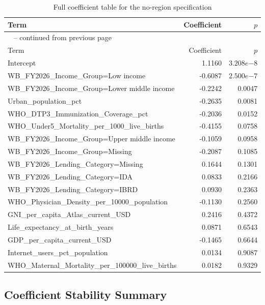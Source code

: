 \documentclass[runningheads]{llncs}
\begin{document}
{\begin{longtable}{p{}r@{\hspace{1.5em}}r}
\caption{Full coefficient table for the no-region specification}\label{tab:appendix-coefficients-no-region}\\
\hline
Term & Coefficient & $p$ \\
\hline
\endfirsthead
\multicolumn{3}{l}{\tablename\ \thetable{} -- continued from previous page}\\
\hline
Term & Coefficient & $p$ \\
\hline
\endhead
Intercept & 1.1160 & $3.208e{-8}$ \\
WB\_FY2026\_Income\_Group=Low income & -0.6087 & $2.500e{-7}$ \\
WB\_FY2026\_Income\_Group=Lower middle income & -0.2242 & 0.0047 \\
Urban\_population\_pct & -0.2635 & 0.0081 \\
WHO\_DTP3\_Immunization\_Coverage\_pct & -0.2036 & 0.0152 \\
WHO\_Under5\_Mortality\_per\_1000\_live\_births & -0.4155 & 0.0758 \\
WB\_FY2026\_Income\_Group=Upper middle income & -0.1059 & 0.0958 \\
WB\_FY2026\_Income\_Group=Missing & -0.2087 & 0.1085 \\
WB\_FY2026\_Lending\_Category=Missing & 0.1644 & 0.1301 \\
WB\_FY2026\_Lending\_Category=IDA & 0.0833 & 0.2166 \\
WB\_FY2026\_Lending\_Category=IBRD & 0.0930 & 0.2363 \\
WHO\_Physician\_Density\_per\_10000\_population & -0.1130 & 0.2560 \\
GNI\_per\_capita\_Atlas\_current\_USD & 0.2416 & 0.4372 \\
Life\_expectancy\_at\_birth\_years & 0.0871 & 0.6543 \\
GDP\_per\_capita\_current\_USD & -0.1465 & 0.6644 \\
Internet\_users\_pct\_population & 0.0134 & 0.9087 \\
WHO\_Maternal\_Mortality\_per\_100000\_live\_births & 0.0182 & 0.9329 \\
\hline
\end{longtable}
}

\subsection{Coefficient Stability Summary}
\end{document}
